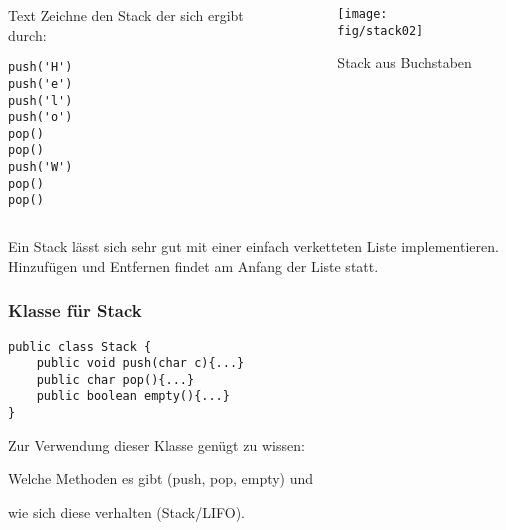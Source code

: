 \begin{multicols}{2}
\begin{frame}[fragile]


\begin{columns}[c]\begin{column}{0.4 \textwidth}
\begin{assignment}{3cm}{Text}
Zeichne den Stack der sich ergibt durch:
\begin{addmargin}{1em}
\begin{Verbatim}
push('H')
push('e')
push('l')
push('o')
pop()
pop()
push('W')
pop()
pop()
\end{Verbatim}
\end{addmargin}

\end{assignment}
\end{column}
\begin{column}{0.6 \textwidth}
\pause
\begin{vers:beamersolutions}\begin{Loesung}
\pause%
\begin{figure}[H]
    \centering
    \texttt{[image: fig/stack02]}
    \caption{Stack aus Buchstaben}
\end{figure}
\end{Loesung}\end{vers:beamersolutions}
\end{column}\end{columns}

\pause
\begin{fact}
Ein Stack lässt sich sehr gut mit einer einfach verketteten Liste implementieren.
Hinzufügen und Entfernen findet am Anfang der Liste statt.
\end{fact}

\end{frame}

\begin{frame}[fragile]
\frametitle{Klasse für Stack}

\begin{lstlisting}[emph={}]
public class Stack {
    public void push(char c){...}
    public char pop(){...}
    public boolean empty(){...}
}
\end{lstlisting}
\pause
Zur Verwendung dieser Klasse genügt zu wissen:
\begin{compactitem}
\item Welche Methoden es gibt (push, pop, empty) und
\item wie sich diese verhalten (Stack/LIFO).
\end{compactitem}


\end{frame}
\end{multicols}
